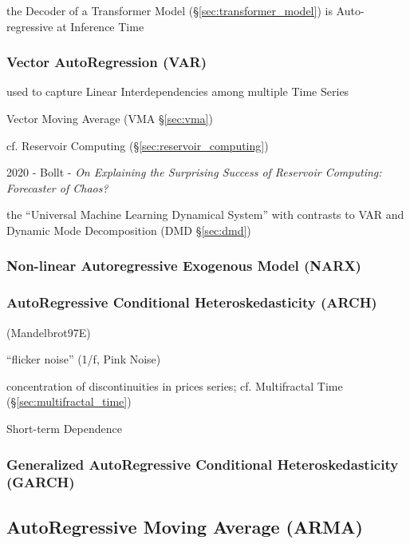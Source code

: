 the Decoder of a Transformer Model (\S\ref{sec:transformer_model}) is
Auto-regressive at Inference Time



\subsubsection{Vector AutoRegression (VAR)}\label{sec:var}

used to capture Linear Interdependencies among multiple Time Series

Vector Moving Average (VMA \S\ref{sec:vma})

cf. Reservoir Computing (\S\ref{sec:reservoir_computing})

2020 - Bollt - \emph{On Explaining the Surprising Success of Reservoir
  Computing: Forecaster of Chaos?}

the ``Universal Machine Learning Dynamical System'' with contrasts to VAR and
Dynamic Mode Decomposition (DMD \S\ref{sec:dmd})



\subsubsection{Non-linear Autoregressive Exogenous Model (NARX)}\label{sec:narx}

\subsubsection{AutoRegressive Conditional Heteroskedasticity (ARCH)}
\label{sec:arch}

(Mandelbrot97E)

``flicker noise'' (1/f, Pink Noise)

concentration of discontinuities in prices series; cf. Multifractal Time
(\S\ref{sec:multifractal_time})

Short-term Dependence



\subsubsection{Generalized AutoRegressive Conditional Heteroskedasticity (GARCH)}
\label{sec:garch}



\subsection{AutoRegressive Moving Average (ARMA)}\label{sec:arma}

